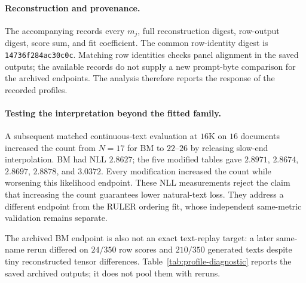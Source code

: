 \paragraph{Reconstruction and provenance.}
The accompanying  records every $m_j$, full reconstruction digest, row-output digest, score sum, and fit coefficient. The common row-identity digest is \texttt{14736f284ac30c0c}. Matching row identities checks panel alignment in the saved outputs; the available records do not supply a new prompt-byte comparison for the archived endpoints. The analysis therefore reports the response of the recorded profiles.


\paragraph{Testing the interpretation beyond the fitted family.}
A subsequent matched continuous-text evaluation at $16$K on $16$ documents increased the count from $N=17$ for BM to $22$--$26$ by releasing slow-end interpolation. BM had NLL $2.8627$; the five modified tables gave $2.8971$, $2.8674$, $2.8697$, $2.8878$, and $3.0372$. Every modification increased the count while worsening this likelihood endpoint. These NLL measurements reject the claim that increasing the count guarantees lower natural-text loss. They address a different endpoint from the RULER ordering fit, whose independent same-metric validation remains separate.

The archived BM endpoint is also not an exact text-replay target: a later same-name rerun differed on $24/350$ row scores and $210/350$ generated texts despite tiny reconstructed tensor differences. Table~\ref{tab:profile-diagnostic} reports the saved archived outputs; it does not pool them with reruns.
